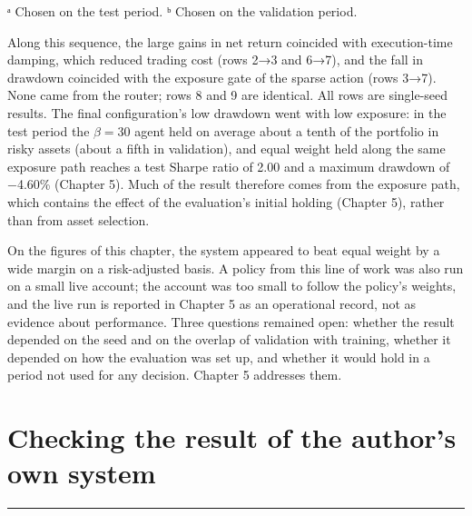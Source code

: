 \documentclass[12pt,a4paper]{report}
\begin{document}
ᵃ Chosen on the test period. ᵇ Chosen on the validation period.

Along this sequence, the large gains in net return coincided with
execution-time damping, which reduced trading cost (rows 2→3 and 6→7),
and the fall in drawdown coincided with the exposure gate of the sparse
action (rows 3→7). None came from the router; rows 8 and 9 are
identical. All rows are single-seed results. The final configuration's
low drawdown went with low exposure: in the test period the \(\beta=30\)
agent held on average about a tenth of the portfolio in risky assets
(about a fifth in validation), and equal weight held along the same
exposure path reaches a test Sharpe ratio of 2.00 and a maximum drawdown
of −4.60\% (Chapter 5). Much of the result therefore comes from the
exposure path, which contains the effect of the evaluation's initial
holding (Chapter 5), rather than from asset selection.

On the figures of this chapter, the system appeared to beat equal weight
by a wide margin on a risk-adjusted basis. A policy from this line of
work was also run on a small live account; the account was too small to
follow the policy's weights, and the live run is reported in Chapter 5
as an operational record, not as evidence about performance. Three
questions remained open: whether the result depended on the seed and on
the overlap of validation with training, whether it depended on how the
evaluation was set up, and whether it would hold in a period not used
for any decision. Chapter 5 addresses them.

\chapter{Checking the result of the author's own
system}\label{chapter-5.-checking-the-result-of-the-authors-own-system}

\begin{center}\rule{0.5\linewidth}{0.5pt}\end{center}
\end{document}
